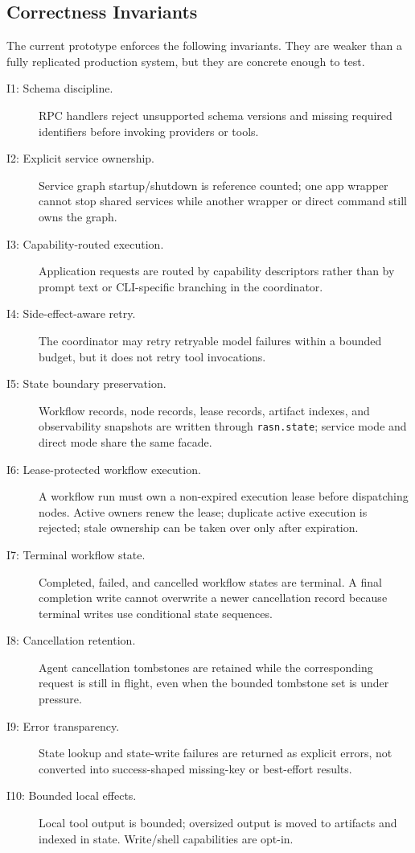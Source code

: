 \documentclass[manuscript,screen,review]{acmart}
\begin{document}
\subsection{Correctness Invariants}

The current prototype enforces the following invariants. They are weaker than a
fully replicated production system, but they are concrete enough to test.

\begin{description}
  \item[I1: Schema discipline.] RPC handlers reject unsupported schema versions
  and missing required identifiers before invoking providers or tools.
  \item[I2: Explicit service ownership.] Service graph startup/shutdown is
  reference counted; one app wrapper cannot stop shared services while another
  wrapper or direct command still owns the graph.
  \item[I3: Capability-routed execution.] Application requests are routed by
  capability descriptors rather than by prompt text or CLI-specific branching in
  the coordinator.
  \item[I4: Side-effect-aware retry.] The coordinator may retry retryable model
  failures within a bounded budget, but it does not retry tool invocations.
  \item[I5: State boundary preservation.] Workflow records, node records, lease
  records, artifact indexes, and observability snapshots are written through
  \texttt{rasn.state}; service mode and direct mode share the same facade.
  \item[I6: Lease-protected workflow execution.] A workflow run must own a
  non-expired execution lease before dispatching nodes. Active owners renew the
  lease; duplicate active execution is rejected; stale ownership can be taken
  over only after expiration.
  \item[I7: Terminal workflow state.] Completed, failed, and cancelled workflow
  states are terminal. A final completion write cannot overwrite a newer
  cancellation record because terminal writes use conditional state sequences.
  \item[I8: Cancellation retention.] Agent cancellation tombstones are retained
  while the corresponding request is still in flight, even when the bounded
  tombstone set is under pressure.
  \item[I9: Error transparency.] State lookup and state-write failures are
  returned as explicit errors, not converted into success-shaped missing-key or
  best-effort results.
  \item[I10: Bounded local effects.] Local tool output is bounded; oversized
  output is moved to artifacts and indexed in state. Write/shell capabilities
  are opt-in.
\end{description}
\end{document}
